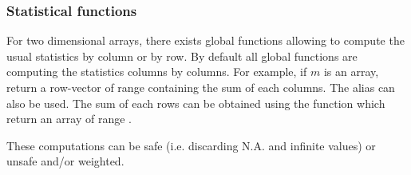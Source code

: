 \documentclass[a4paper,10pt]{article}
\begin{document}
\subsubsection{Statistical functions}

For two dimensional arrays, there exists global functions allowing to compute
the usual statistics by column or by row. By default all global functions are
computing the statistics columns by columns. For example, if $m$ is an array, 
return a row-vector of range  containing the sum of each columns.
The alias  can also be used. The sum of each rows can be obtained
using the function  which return an array of range .

These computations can be safe (i.e. discarding N.A. and infinite values) or unsafe
and/or weighted.
\end{document}
